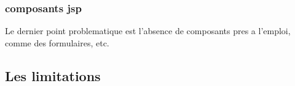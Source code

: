 \subsubsection{composants jsp}
Le dernier point problematique est l'absence de composants pres a l'emploi, comme des formulaires, etc.
\subsection{Les limitations}
\subsubsection{}